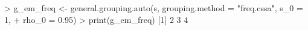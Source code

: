 \begin{CodeChunk}
\begin{CodeInput}


> g_em_freq <- general.grouping.auto(s, grouping.method = "freq.cssa", s_0 = 1, 
+                                  rho_0 = 0.95)
> print(g_em_freq)
[1] 2 3 4
\end{CodeInput}

\end{CodeChunk}